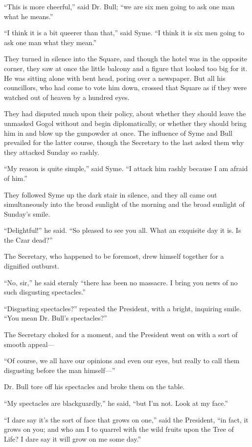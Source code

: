“This is more cheerful,” said Dr. Bull; “we are six men going to ask one man what he means.”

“I think it is a bit queerer than that,” said Syme. “I think it is six men going to ask one man what they mean.”

They turned in silence into the Square, and though the hotel was in the opposite corner, they saw at once the little balcony and a figure that looked too big for it. He was sitting alone with bent head, poring over a newspaper. But all his councillors, who had come to vote him down, crossed that Square as if they were watched out of heaven by a hundred eyes.

They had disputed much upon their policy, about whether they should leave the unmasked Gogol without and begin diplomatically, or whether they should bring him in and blow up the gunpowder at once. The influence of Syme and Bull prevailed for the latter course, though the Secretary to the last asked them why they attacked Sunday so rashly.

“My reason is quite simple,” said Syme. “I attack him rashly because I am afraid of him.”

They followed Syme up the dark stair in silence, and they all came out simultaneously into the broad sunlight of the morning and the broad sunlight of Sunday’s smile.

“Delightful!” he said. “So pleased to see you all. What an exquisite day it is. Is the Czar dead?”

The Secretary, who happened to be foremost, drew himself together for a dignified outburst.

“No, sir,” he said sternly “there has been no massacre. I bring you news of no such disgusting spectacles.”

“Disgusting spectacles?” repeated the President, with a bright, inquiring smile. “You mean Dr. Bull’s spectacles?”

The Secretary choked for a moment, and the President went on with a sort of smooth appeal⁠—

“Of course, we all have our opinions and even our eyes, but really to call them disgusting before the man himself⁠—”

Dr. Bull tore off his spectacles and broke them on the table.

“My spectacles are blackguardly,” he said, “but I’m not. Look at my face.”

“I dare say it’s the sort of face that grows on one,” said the President, “in fact, it grows on you; and who am I to quarrel with the wild fruits upon the Tree of Life? I dare say it will grow on me some day.”

